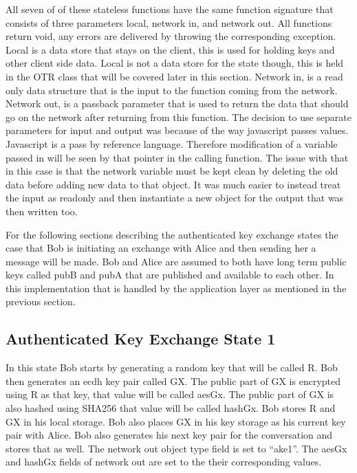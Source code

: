 All seven of of these stateless functions have the same function signature that consists of three parameters local, network in, and network out. All functions return void, any errors are delivered by throwing the corresponding exception. Local is a data store that stays on the client, this is used for holding keys and other client side data. Local is not a data store for the state though, this is held in the OTR class that will be covered later in this section. Network in, is a read only data structure that is the input to the function coming from the network. Network out, is a passback parameter that is used to return the data that should go on the network after returning from this function. The decision to use separate parameters for input and output was because of the way javascript passes values. Javascript is a pass by reference language. Therefore modification of a variable passed in will be seen by that pointer in the calling function. The issue with that in this case is that the network variable must be kept clean by deleting the old data before adding new data to that object. It was much easier to instead treat the input as readonly and then instantiate a new object for the output that was then written too.


For the following sections describing the authenticated key exchange states the case that Bob is initiating an exchange with Alice and then sending her a message will be made. Bob and Alice are assumed to both have long term public keys called pubB and pubA that are published and available to each other. In this implementation that is handled by the application layer as mentioned in the previous section.


\subsection{Authenticated Key Exchange State 1}


In this state Bob starts by generating a random key that will be called R. Bob then generates an ecdh key pair called GX. The public part of GX is encrypted using R as that key, that value will be called aesGx. The public part of GX is also hashed using SHA256 that value will be called hashGx. Bob stores R and GX in his local storage. Bob also places GX in his key storage as his current key pair with Alice. Bob also generates his next key pair for the conversation and stores that as well. The network out object type field is set to “ake1”. The aesGx and hashGx fields of network out are set to the their corresponding values.


